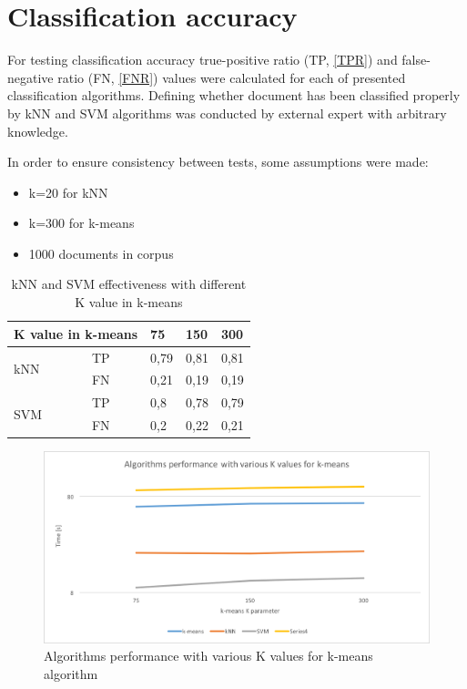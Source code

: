 \section{Classification accuracy} \label{classification-accuracy}

For testing classification accuracy true-positive ratio (TP, \ref{TPR}) and false-negative ratio (FN, \ref{FNR}) values were calculated for each of presented classification algorithms. Defining whether document has been classified properly by kNN and SVM algorithms was conducted by external expert with arbitrary knowledge.

In order to ensure consistency between tests, some assumptions were made:

\begin{itemize}
	\item k=20 for kNN
	\item k=300 for k-means
	\item 1000 documents in corpus
\end{itemize}

\begin{table}[H]
	\centering
	\caption{kNN and SVM effectiveness with different K value in k-means}
	\label{tests:param:kmeans}
	\begin{tabular}{@{}lllll@{}}
		\toprule
		\multicolumn{2}{l}{K value in k-means}     & 75   & 150  & 300  \\ \midrule
		\multirow{2}{*}{kNN} & TP & 0,79 & 0,81 & 0,81 \\
		& FN & 0,21 & 0,19 & 0,19 \\
		\multirow{2}{*}{SVM} & TP & 0,8  & 0,78 & 0,79 \\
		& FN & 0,2  & 0,22 & 0,21 \\ \bottomrule
	\end{tabular}
\end{table}

\begin{figure}[H]
	\begin{center}
		\includegraphics[width=0.9\linewidth]{images/tests/param-kmeans.png}
		\caption{Algorithms performance with various K values for k-means algorithm}
		\label{param-kmeans}
	\end{center}
\end{figure}


